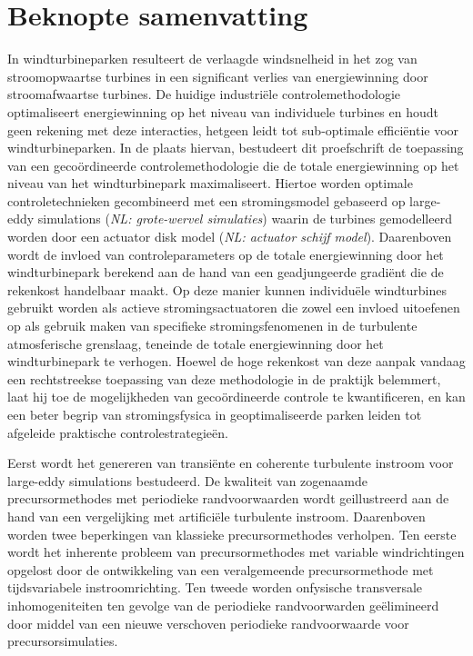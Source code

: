 \chapter*{Beknopte samenvatting}

In windturbineparken resulteert de verlaagde windsnelheid in het zog van stroomopwaartse turbines in een significant verlies van energiewinning door stroomafwaartse turbines. De huidige industri\"ele controlemethodologie optimaliseert energiewinning op het niveau van individuele turbines en houdt geen rekening met deze interacties, hetgeen leidt tot sub-optimale effici\"entie voor windturbineparken. In de plaats hiervan, bestudeert dit proefschrift de toepassing van een geco\"ordineerde controlemethodologie die de totale energiewinning op het niveau van het windturbinepark maximaliseert. Hiertoe worden optimale controletechnieken gecombineerd met een stromingsmodel gebaseerd op large-eddy simulations (\emph{NL: grote-wervel simulaties}) waarin de turbines gemodelleerd worden door een actuator disk model (\emph{NL: actuator schijf model}). Daarenboven wordt de invloed van controleparameters op de totale energiewinning door het windturbinepark berekend aan de hand van een geadjungeerde gradi\"ent die de rekenkost handelbaar maakt. Op deze manier kunnen individu\"ele windturbines gebruikt worden als actieve stromingsactuatoren die zowel een invloed uitoefenen op als gebruik maken van specifieke stromingsfenomenen in de turbulente atmosferische grenslaag, teneinde de totale energiewinning door het windturbinepark te verhogen. Hoewel de hoge rekenkost van deze aanpak vandaag een rechtstreekse toepassing van deze methodologie in de praktijk belemmert, laat hij toe de mogelijkheden van geco\"ordineerde controle te kwantificeren, en kan een beter begrip van stromingsfysica in geoptimaliseerde parken leiden tot afgeleide praktische controlestrategie\"en. 

Eerst wordt het genereren van transi\"ente en coherente turbulente instroom voor large-eddy simulations bestudeerd. De kwaliteit van zogenaamde precursormethodes met periodieke randvoorwaarden wordt geillustreerd aan de hand van een vergelijking met artifici\"ele turbulente instroom. Daarenboven worden twee beperkingen van klassieke precursormethodes verholpen. Ten eerste wordt het inherente probleem van precursormethodes met variable windrichtingen opgelost door de ontwikkeling van een veralgemeende precursormethode met tijdsvariabele instroomrichting. Ten tweede worden onfysische transversale inhomogeniteiten ten gevolge van de periodieke randvoorwarden ge\"elimineerd door middel van een nieuwe verschoven periodieke randvoorwaarde voor precursorsimulaties. 

